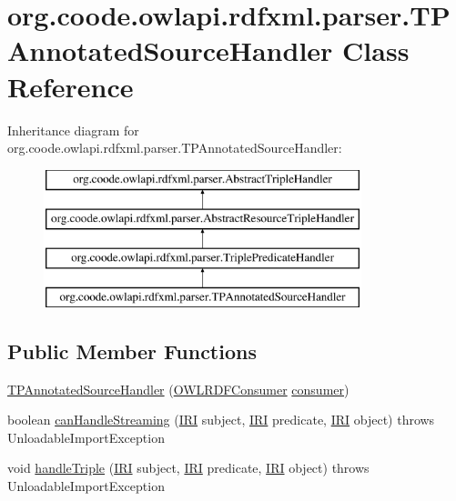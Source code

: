 \hypertarget{classorg_1_1coode_1_1owlapi_1_1rdfxml_1_1parser_1_1_t_p_annotated_source_handler}{\section{org.\-coode.\-owlapi.\-rdfxml.\-parser.\-T\-P\-Annotated\-Source\-Handler Class Reference}
\label{classorg_1_1coode_1_1owlapi_1_1rdfxml_1_1parser_1_1_t_p_annotated_source_handler}
}
Inheritance diagram for org.\-coode.\-owlapi.\-rdfxml.\-parser.\-T\-P\-Annotated\-Source\-Handler\-:\begin{figure}[H]
\begin{center}
\leavevmode
\includegraphics[height=4.000000cm]{classorg_1_1coode_1_1owlapi_1_1rdfxml_1_1parser_1_1_t_p_annotated_source_handler}
\end{center}
\end{figure}
\subsection*{Public Member Functions}
\begin{DoxyCompactItemize}
\item 
\hyperlink{classorg_1_1coode_1_1owlapi_1_1rdfxml_1_1parser_1_1_t_p_annotated_source_handler_a2a62091b1fc9841780f5689d77168309}{T\-P\-Annotated\-Source\-Handler} (\hyperlink{classorg_1_1coode_1_1owlapi_1_1rdfxml_1_1parser_1_1_o_w_l_r_d_f_consumer}{O\-W\-L\-R\-D\-F\-Consumer} \hyperlink{classorg_1_1coode_1_1owlapi_1_1rdfxml_1_1parser_1_1_abstract_triple_handler_a4ccf4d898ff01eb1cadfa04b23d54e9c}{consumer})
\item 
boolean \hyperlink{classorg_1_1coode_1_1owlapi_1_1rdfxml_1_1parser_1_1_t_p_annotated_source_handler_a43ee0b9676b92835f89b6f2bd8c94f5d}{can\-Handle\-Streaming} (\hyperlink{classorg_1_1semanticweb_1_1owlapi_1_1model_1_1_i_r_i}{I\-R\-I} subject, \hyperlink{classorg_1_1semanticweb_1_1owlapi_1_1model_1_1_i_r_i}{I\-R\-I} predicate, \hyperlink{classorg_1_1semanticweb_1_1owlapi_1_1model_1_1_i_r_i}{I\-R\-I} object)  throws Unloadable\-Import\-Exception 
\item 
void \hyperlink{classorg_1_1coode_1_1owlapi_1_1rdfxml_1_1parser_1_1_t_p_annotated_source_handler_ae4f209335a91a15b2f9229ea9b7f3cf0}{handle\-Triple} (\hyperlink{classorg_1_1semanticweb_1_1owlapi_1_1model_1_1_i_r_i}{I\-R\-I} subject, \hyperlink{classorg_1_1semanticweb_1_1owlapi_1_1model_1_1_i_r_i}{I\-R\-I} predicate, \hyperlink{classorg_1_1semanticweb_1_1owlapi_1_1model_1_1_i_r_i}{I\-R\-I} object)  throws Unloadable\-Import\-Exception 
\end{DoxyCompactItemize}
